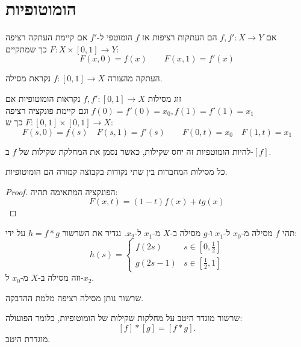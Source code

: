 \documentclass{tstextbook}
\begin{document}
\section{הומוטופיות}

\begin{definition}[הומוטופיה]
אם \(f,f':X\to Y\) הם העתקות רציפות אז \(f\) הומוטפי ל-\(f'\) אם קיימת העתקה רציפה \(F:X\times[0,1]\to Y\) כך שמתקיים:
$$F(x,0)=f(x)\qquad F(x,1)=f'(x)$$

\end{definition}
\begin{definition}[מסילה]
העתקה מהצורה \(f:[0,1]\to X\) נקראת מסילה.

\end{definition}
\begin{definition}
זוג מסילות \(f,f':[0,1]\to X\) נקראות הומוטופיות אם \(f(0)=f'(0)=x_{0},f(1)=f'(1)=x_{1}\) וגם קיימת פונקציה רציפה \(F:[0,1]\times[0,1]\to X\) כך ש:
$$F(s,0)=f(s)\quad F(s,1)=f'(s)\qquad F(0,t)=x_{0}\quad F(1,t)=x_{1}$$

\end{definition}
\begin{proposition}
להיות הומוטפיות זה יחס שקילות, כאשר נסמן את המחלקת שקילות של \(f\) ב-\([f]\).

\end{proposition}
\begin{proposition}
כל מסילות המחברות בין שתי נקודות בקבוצה קמורה הם הומוטופיות.

\end{proposition}
\begin{proof}
הפונקציה המתאימה תהיה:
$$F(x,t)=(1-t)f(x)+t g(x)$$

\end{proof}
\begin{definition}[שרשרור]
תהי \(f\) מסילה מ-\(x_{0}\) ל-\(x_{1}\) ו-\(g\) מסילה ב-\(X\) מ-\(x_{1}\) ל-\(x_{2}\). נגדיר את השרשור \(h=f*g\) על ידי:
$$h(s)=\begin{cases}f(2s) & s \in \left[ 0,\frac{1}{2} \right] \\g(2s-1) & s \in \left[ \frac{1}{2},1 \right]
\end{cases}$$
וזה מסילה ב-\(X\) מ-\(x_{0}\) ל-\(x_{2}\).

\end{definition}
\begin{remark}
שרשור נותן מסילה רציפה מלמת ההדבקה.

\end{remark}
\begin{proposition}
שרשור מוגדר היטב על מחלקות שקילות של הומוטופיות, כלומר הפועולה:
$$[f]\ast[g]=[f\ast g].$$
מוגדרת היטב.

\end{proposition}
\end{document}

